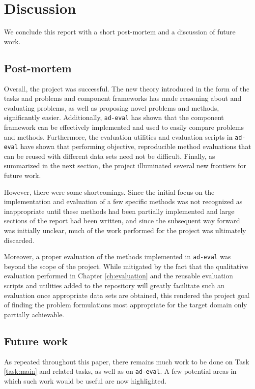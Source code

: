 \chapter{Discussion}
\label{ch:discussion}

We conclude this report with a short post-mortem and a discussion of future work.

\section{Post-mortem}

Overall, the project was successful. The new theory introduced in the form of the tasks and problems and component frameworks has made reasoning about and evaluating problems, as well as proposing novel problems and methods, significantly easier. Additionally, \texttt{ad-eval} has shown that the component framework can be effectively implemented and used to easily compare problems and methods. Furthermore, the evaluation utilities and evaluation scripts in \texttt{ad-eval} have shown that performing objective, reproducible method evaluations that can be reused with different data sets need not be difficult. Finally, as summarized in the next section, the project illuminated several new frontiers for future work.

However, there were some shortcomings. Since the initial focus on the implementation and evaluation of a few specific methods was not recognized as inappropriate until these methods had been partially implemented and large sections of the report had been written, and since the subsequent way forward was initially unclear, much of the work performed for the project was ultimately discarded.

Moreover, a proper evaluation of the methods implemented in \texttt{ad-eval} was beyond the scope of the project. While mitigated by the fact that the qualitative evaluation performed in Chapter \ref{ch:evaluation} and the reusable evaluation scripts and utilities added to the repository will greatly facilitate such an evaluation once appropriate data sets are obtained, this rendered the project goal of finding the problem formulations most appropriate for the target domain only partially achievable.

\section{Future work}

As repeated throughout this paper, there remains much work to be done on Task \ref{task:main} and related tasks, as well as on \texttt{ad-eval}. A few potential areas in which such work would be useful are now highlighted.

